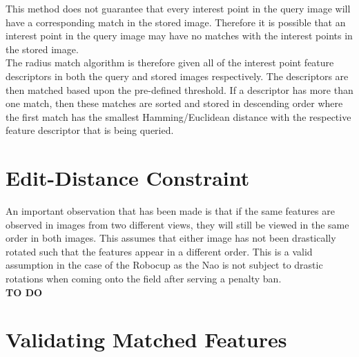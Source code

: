 \documentclass[11pt]{report}
\begin{document}
This method does not guarantee that every interest point in the query image will have a corresponding match in the stored image. Therefore it is possible that an interest point in the query image may have no matches with the interest points in the stored image.\\

The radius match algorithm is therefore given all of the interest point feature descriptors in both the query and stored images respectively. The descriptors are then matched based upon the pre-defined threshold. If a descriptor has more than one match, then these matches are sorted and stored in descending order where the first match has the smallest Hamming/Euclidean distance with the respective feature descriptor that is being queried.\\ 

\section{Edit-Distance Constraint}
\label{sec:editDistance}
An important observation that has been made is that if the same features are observed in images from two different views, they will still be viewed in the same order in both images. This assumes that either image has not been drastically rotated such that the features appear in a different order. This is a valid assumption in the case of the Robocup as the Nao is not subject to drastic rotations when coming onto the field after serving a penalty ban.\\

\textbf{TO DO}
%


\section{Validating Matched Features}
\label{sec:validation}
\end{document}
